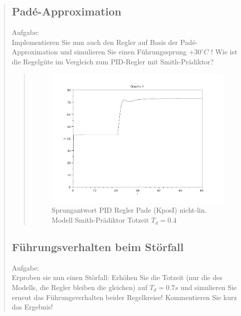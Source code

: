 \begin{quote}
\begin{quote}
    \end{quote}
    
    
    \subsection{Pad\'e-Approximation}
    Aufgabe:\\
    Implementieren Sie nun auch den Regler auf Basis der Pad\'e-Approximation und simulieren Sie einen Führungssprung
    $+30^{\circ} C$ ! Wie ist die Regelgüte im Vergleich zum PID-Regler mit Smith-Prädiktor?\vspace{1em}
    
    
    \begin{quote}
        \begin{figure}[H]
        \centering
            \includegraphics[scale=0.7, trim = 0cm 0cm 0cm 0cm, clip]{./Bilder/4_4_Td_04}
                \caption{Sprungantwort PID Regler Pade (KposI) nicht-lin. Modell Smith-Prädiktor Totzeit $T_d = 0.4$}
        \end{figure}
        
    \end{quote}
    
    
    \subsection{Führungsverhalten beim Störfall}
    Aufgabe:\\
    Erproben sie nun einen Störfall: Erhöhen Sie die Totzeit (nur die des Modells, die Regler bleiben die gleichen)
    auf $T_d = 0.7s$ und simulieren Sie erneut das Führungsverhalten beider Regelkreise! Kommentieren Sie kurz das
    Ergebnis!\vspace{1em}
    

\end{quote}
